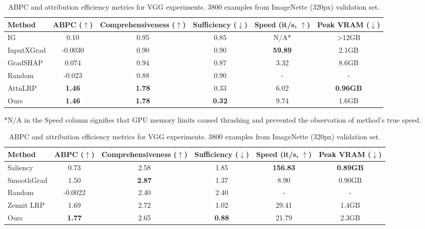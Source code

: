 \documentclass{article}
\begin{document}
\begin{table}[h]
\begin{center}
  \vspace{10pt}
  \caption{ABPC and attribution efficiency metrics for ViT-b-16 experiments. 1000 examples from CIFAR-10 test set.}
  \label{vit-table}
  \begin{tabular}{ lccccc }
    \toprule
    \textbf{Method} & \textbf{ABPC ($\uparrow$)} & \textbf{Comprehensiveness ($\uparrow$)} & \textbf{Sufficiency ($\downarrow$)} & \textbf{Speed (it/s, $\uparrow$)} & \textbf{Peak VRAM ($\downarrow$)} \\
    \midrule
    IG & 0.10 & 0.95 & 0.85 & N/A* & >12GB \\ 
    InputXGrad & -0.0030 & 0.90 & 0.90 & \textbf{59.89} & 2.1GB \\ 
    GradSHAP & 0.074 & 0.94 & 0.87 & 3.32 & 8.6GB \\
    Random & -0.023 & 0.88 & 0.90 & - & - \\
    AttnLRP & \textbf{1.46} & \textbf{1.78} & 0.33 & 6.02 & \textbf{0.96GB} \\
    \midrule
    Ours & \textbf{1.46} & \textbf{1.78} & \textbf{0.32} & 9.74 & 1.6GB \\
    \bottomrule
  \end{tabular}
\end{center}
\vspace{0.1cm}
*N/A in the Speed column signifies that GPU memory limits caused thrashing and prevented the observation of method's true speed.
\vspace{10pt}
\begin{center}
  \caption{ABPC and attribution efficiency metrics for VGG experiments. 3800 examples from ImageNette (320px) validation set.}
  \label{vgg-table}
  \begin{tabular}{ lccccc }
    \toprule
    \textbf{Method} & \textbf{ABPC ($\uparrow$)} & \textbf{Comprehensiveness ($\uparrow$)} & \textbf{Sufficiency ($\downarrow$)} & \textbf{Speed (it/s, $\uparrow$)} & \textbf{Peak VRAM ($\downarrow$)} \\
    \midrule
    Saliency & 0.73 & 2.58 & 1.85 & \textbf{156.83} & \textbf{0.89GB} \\ 
    SmoothGrad & 1.50 & \textbf{2.87} & 1.37 & 8.90 & 0.90GB \\ 
    Random & -0.0022 & 2.40 & 2.40 & - & - \\
    Zennit LRP & 1.69 & 2.72 & 1.02 & 29.41 & 1.4GB \\
    \midrule
    Ours & \textbf{1.77} & 2.65 & \textbf{0.88} & 21.79 & 2.3GB \\
    \bottomrule
  \end{tabular}
\end{center}
\end{table}
\end{document}
